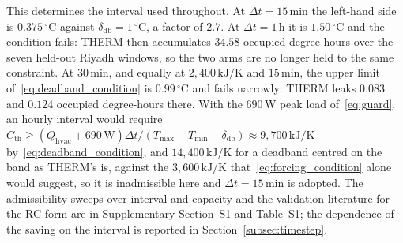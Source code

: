 \documentclass[3p,twocolumn,number]{elsarticle}
\newcommand{\Tmin}{T_{\min}}
\newcommand{\Tmax}{T_{\max}}
\newcommand{\deadband}{\delta_{\mathrm{db}}}
\newcommand{\Cth}{C_{\mathrm{th}}}
\newcommand{\Qhvac}{Q_{\mathrm{hvac}}}
\begin{document}
\begin{remark}
This determines the interval used throughout. At $\Delta t=15\,$min the left-hand side is $0.375\,^\circ$C against $\deadband=1\,^\circ$C, a factor of $2.7$. At $\Delta t=1\,$h it is $1.50\,^\circ$C and the condition fails: THERM then accumulates $34.58$ occupied degree-hours over the seven held-out Riyadh windows, so the two arms are no longer held to the same constraint. At $30\,$min, and equally at $2{,}400\,\text{kJ/K}$ and $15\,$min, the upper limit of~\eqref{eq:deadband_condition} is $0.99\,^\circ$C and fails narrowly: THERM leaks $0.083$ and $0.124$ occupied degree-hours there. With the $690\,$W peak load of~\eqref{eq:guard}, an hourly interval would require $\Cth\ge(\Qhvac+690\,\mathrm{W})\Delta t/(\Tmax-\Tmin-\deadband)\approx9{,}700\,\text{kJ/K}$ by~\eqref{eq:deadband_condition}, and $14{,}400\,\text{kJ/K}$ for a deadband centred on the band as THERM's is, against the $3{,}600\,\text{kJ/K}$ that~\eqref{eq:forcing_condition} alone would suggest, so it is inadmissible here and $\Delta t=15\,$min is adopted. The admissibility sweeps over interval and capacity and the validation literature for the RC form are in Supplementary Section~S1 and Table~S1; the dependence of the saving on the interval is reported in Section~\ref{subsec:timestep}.
\end{remark}
 
\end{document}
